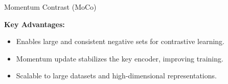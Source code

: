 \begin{frame}[allowframebreaks]{Momentum Contrast (MoCo)}
    \framebreak

    \textbf{Key Advantages:}
    \begin{itemize}
        \item Enables large and consistent negative sets for contrastive learning.
        \item Momentum update stabilizes the key encoder, improving training.
        \item Scalable to large datasets and high-dimensional representations.
    \end{itemize}
\end{frame}